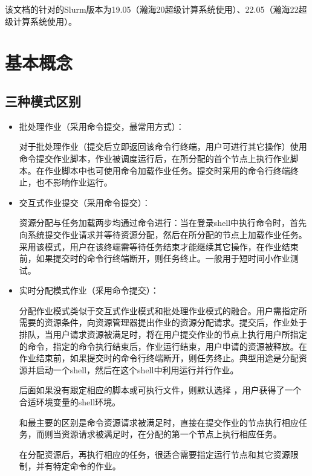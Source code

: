 \documentclass[a4paper,12pt,english]{sphinxmanual}
\begin{document}
\sphinxAtStartPar
该文档的针对的Slurm版本为19.05（瀚海20超级计算系统使用）、22.05（瀚海22超级计算系统使用）。


\section{基本概念}
\label{\detokenize{slurm/slurm:id2}}

\subsection{三种模式区别}
\label{\detokenize{slurm/slurm:id3}}\begin{itemize}
\item {} 
\sphinxAtStartPar
批处理作业（采用命令提交，最常用方式）：

\sphinxAtStartPar
对于批处理作业（提交后立即返回该命令行终端，用户可进行其它操作）使用命令提交作业脚本，作业被调度运行后，在所分配的首个节点上执行作业脚本。在作业脚本中也可使用命令加载作业任务。提交时采用的命令行终端终止，也不影响作业运行。

\item {} 
\sphinxAtStartPar
交互式作业提交（采用命令提交）：

\sphinxAtStartPar
资源分配与任务加载两步均通过命令进行：当在登录shell中执行命令时，首先向系统提交作业请求并等待资源分配，然后在所分配的节点上加载作业任务。采用该模式，用户在该终端需等待任务结束才能继续其它操作，在作业结束前，如果提交时的命令行终端断开，则任务终止。一般用于短时间小作业测试。

\item {} 
\sphinxAtStartPar
实时分配模式作业（采用命令提交）：

\sphinxAtStartPar
分配作业模式类似于交互式作业模式和批处理作业模式的融合。用户需指定所需要的资源条件，向资源管理器提出作业的资源分配请求。提交后，作业处于排队，当用户请求资源被满足时，将在用户提交作业的节点上执行用户所指定的命令，指定的命令执行结束后，作业运行结束，用户申请的资源被释放。在作业结束前，如果提交时的命令行终端断开，则任务终止。典型用途是分配资源并启动一个shell，然后在这个shell中利用运行并行作业。

\sphinxAtStartPar
{}后面如果没有跟定相应的脚本或可执行文件，则默认选择 ，用户获得了一个合适环境变量的shell环境。

\sphinxAtStartPar
{}和最主要的区别是命令资源请求被满足时，直接在提交作业的节点执行相应任务，而则当资源请求被满足时，在分配的第一个节点上执行相应任务。

\sphinxAtStartPar
{}在分配资源后，再执行相应的任务，很适合需要指定运行节点和其它资源限制，并有特定命令的作业。

\end{itemize}
\end{document}
